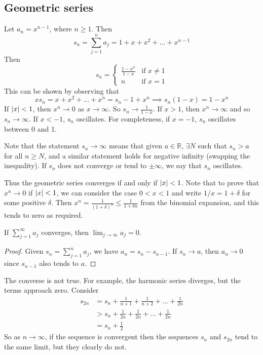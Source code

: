 \subsection{Geometric series}
Let \(a_n = x^{n-1}\), where \(n \geq 1\).
Then
\[
	s_n = \sum_{j=1}^n a_j = 1 + x + x^2 + \dots + x^{n-1}
\]
Then
\[
	s_n = \begin{cases}
		\frac{1 - x^n}{1 - x} & \text{if } x \neq 1 \\
		n                     & \text{if } x = 1
	\end{cases}
\]
This can be shown by observing that
\[
	x s_n = x + x^2 + \dots + x^n = s_n - 1 + x^n \implies s_n(1-x) = 1-x^n
\]
If \(\abs{x} < 1\), then \(x^n \to 0\) as \(x \to \infty\).
So \(s_n \to \frac{1}{1-x}\).
If \(x > 1\), then \(x^n \to \infty\) and so \(s_n \to \infty\).
If \(x < -1\), \(s_n\) oscillates.
For completeness, if \(x=-1\), \(s_n\) oscillates between 0 and 1.

Note that the statement \(s_n \to \infty\) means that given \(a \in \mathbb R\), \(\exists N\) such that \(s_n > a\) for all \(n \geq N\), and a similar statement holds for negative infinity (swapping the inequality).
If \(s_n\) does not converge or tend to \(\pm \infty\), we say that \(s_n\) oscillates.

Thus the geometric series converges if and only if \(\abs{x} < 1\).
Note that to prove that \(x^n \to 0\) if \(\abs{x} < 1\), we can consider the case \(0 < x < 1\) and write \(1/x = 1 + \delta\) for some positive \(\delta\).
Then \(x^n = \frac{1}{(1 + \delta)^n} \leq \frac{1}{1 + \delta n}\) from the binomial expansion, and this tends to zero as required.

\begin{lemma}
	If \(\sum_{j=1}^\infty a_j\) converges, then \(\lim_{j \to \infty} a_j = 0\).
\end{lemma}
\begin{proof}
	Given \(s_n = \sum_{j=1}^n a_j\), we have \(a_n = s_n - s_{n-1}\).
	If \(s_n \to a\), then \(a_n \to 0\) since \(s_{n-1}\) also tends to \(a\).
\end{proof}
\begin{remark}
	The converse is not true.
	For example, the harmonic series diverges, but the terms approach zero.
	Consider
	\begin{align*}
		s_{2n} & = s_n + \frac{1}{n+1} + \frac{1}{n+2} + \dots + \frac{1}{2n} \\
		       & > s_n + \frac{1}{2n} + \frac{1}{2n} + \dots + \frac{1}{2n}   \\
		       & = s_n + \frac{1}{2}
	\end{align*}
	So as \(n \to \infty\), if the sequence is convergent then the sequences \(s_n\) and \(s_{2n}\) tend to the same limit, but they clearly do not.
\end{remark}

